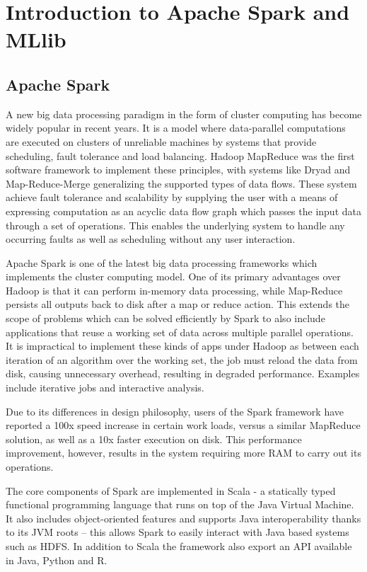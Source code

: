 \documentclass{l4proj}
\begin{document}

\chapter{Introduction to Apache Spark and MLlib}
\label{spark}
\section{Apache Spark}

A new big data processing paradigm in the form of cluster computing has become widely popular in recent years. It is a model where data-parallel computations are executed on clusters of unreliable machines by systems that provide scheduling, fault tolerance and load balancing\cite{Spark}. Hadoop MapReduce was the first software framework to implement these principles\cite{MapReduce}, with systems like Dryad and Map-Reduce-Merge generalizing the supported types of data flows. These system achieve fault tolerance and scalability by supplying the user with a means of expressing computation as an acyclic data flow graph which passes the input data through a set of operations. This enables the underlying system to handle any occurring faults as well as scheduling without any user interaction.

Apache Spark is one of the latest big data processing frameworks which implements the cluster computing model. One of its primary advantages over Hadoop is that it can perform in-memory data processing, while Map-Reduce persists all outputs back to disk after a map or reduce action. This extends the scope of problems which can be solved efficiently by Spark to also include applications that reuse a working set of data across multiple parallel operations. It is impractical to implement these kinds of apps under Hadoop as between each iteration of an algorithm over the working set, the job must reload the data from disk, causing unnecessary overhead, resulting in degraded performance. Examples include iterative jobs and interactive analysis\cite{Spark}.

Due to its differences in design philosophy, users of the Spark framework have reported a 100x speed increase in certain work loads, versus a similar MapReduce solution, as well as a 10x faster execution on disk\cite{webSpark}. This performance improvement, however, results in the system requiring more RAM to carry out its operations.

The core components of Spark are implemented in Scala - a statically typed functional programming language that runs on top of the Java Virtual Machine. It also includes object-oriented features and supports Java interoperability thanks to its JVM roots -- this allows Spark to easily interact with Java based systems such as HDFS. In addition to Scala the framework also export an API available in Java, Python and R.
\end{document}
